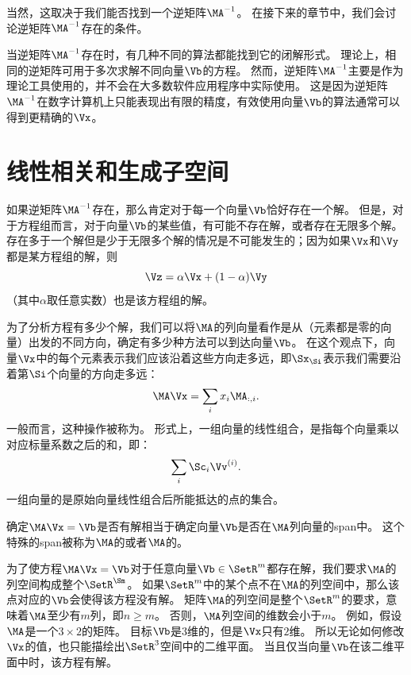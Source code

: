 当然，这取决于我们能否找到一个逆矩阵$\MA^{-1}$。
在接下来的章节中，我们会讨论逆矩阵$\MA^{-1}$存在的条件。


当逆矩阵$\MA^{-1}$存在时，有几种不同的算法都能找到它的闭解形式。
理论上，相同的逆矩阵可用于多次求解不同向量$\Vb$的方程。
然而，逆矩阵$\MA^{-1}$主要是作为理论工具使用的，并不会在大多数软件应用程序中实际使用。
这是因为逆矩阵$\MA^{-1}$在数字计算机上只能表现出有限的精度，有效使用向量$\Vb$的算法通常可以得到更精确的$\Vx$。





\section{线性相关和生成子空间}
\label{sec:linear_dependence_and_span}

如果逆矩阵$\MA^{-1}$存在，那么肯定对于每一个向量$\Vb$恰好存在一个解。
但是，对于方程组而言，对于向量$\Vb$的某些值，有可能不存在解，或者存在无限多个解。
存在多于一个解但是少于无限多个解的情况是不可能发生的；因为如果$\Vx$和$\Vy$都是某方程组的解，则
\begin{equation}
\Vz=\alpha \Vx + (1-\alpha) \Vy
\end{equation}
（其中$\alpha$取任意实数）也是该方程组的解。


为了分析方程有多少个解，我们可以将$\MA$的列向量看作是从（元素都是零的向量）出发的不同方向，确定有多少种方法可以到达向量$\Vb$。
在这个观点下，向量$\Vx$中的每个元素表示我们应该沿着这些方向走多远，即$\Sx_{\Si}$表示我们需要沿着第$\Si$个向量的方向走多远：
\begin{equation}
\MA \Vx = \sum_i x_i \MA_{:,i}.
\end{equation}
一般而言，这种操作被称为。
形式上，一组向量的线性组合，是指每个向量乘以对应标量系数之后的和，即：
\begin{equation}
    \sum_i \Sc_i \Vv^{(i)}.
\end{equation}
一组向量的是原始向量线性组合后所能抵达的点的集合。


确定$\MA\Vx=\Vb$是否有解相当于确定向量$\Vb$是否在$\MA$列向量的\gls{span}中。
这个特殊的\gls{span}被称为$\MA$的或者$\MA$的。


为了使方程$\MA \Vx=\Vb$对于任意向量$\Vb \in \SetR^m$都存在解，我们要求$\MA$的列空间构成整个$\SetR^{\Sm}$。
如果$\SetR^m$中的某个点不在$\MA$的列空间中，那么该点对应的$\Vb$会使得该方程没有解。
矩阵$\MA$的列空间是整个$\SetR^m$的要求，意味着$\MA$至少有$m$列，即$n\geq m$。
否则，$\MA$列空间的维数会小于$m$。
例如，假设$\MA$是一个$3\times 2$的矩阵。
目标$\Vb$是$3$维的，但是$\Vx$只有$2$维。
所以无论如何修改$\Vx$的值，也只能描绘出$\SetR^3$空间中的二维平面。
当且仅当向量$\Vb$在该二维平面中时，该方程有解。



